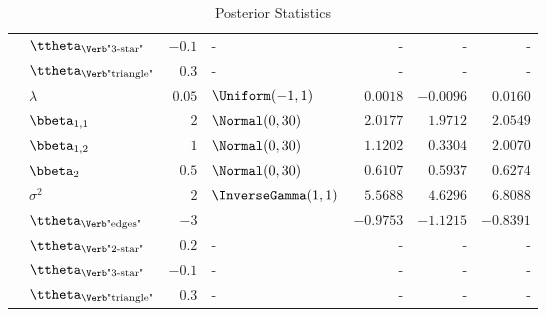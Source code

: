 \begin{table}[t]
\begin{tabular}{cl|rlrrr}
        & $\ttheta_{\text{\Verb"3-star"}}$   & $-0.1$ & -                      & -         & -         & -         \\
        & $\ttheta_{\text{\Verb"triangle"}}$ & $0.3$  & -                      & -         & -         & -         \\
		\midrule
        & $\lambda$                          & $0.05$ & $\Uniform(-1,1)$       & $0.0018$  & $-0.0096$ & $0.0160$  \\
        & $\bbeta_{1,1}$                     & $2$    & $\Normal(0,30)$        & $2.0177$  & $1.9712$  & $2.0549$  \\
        & $\bbeta_{1,2}$                     & $1$    & $\Normal(0,30)$        & $1.1202$  & $0.3304$  & $2.0070$  \\
        & $\bbeta_{2}$                       & $0.5$  & $\Normal(0,30)$        & $0.6107$  & $0.5937$  & $0.6274$  \\
        & $\sigma^2$                         & $2$    & $\InverseGamma(1,1)$   & $5.5688$  & $4.6296$  & $6.8088$  \\
        & $\ttheta_{\text{\Verb"edges"}}$    & $-3$   &  & $-0.9753$ & $-1.1215$ & $-0.8391$ \\
        & $\ttheta_{\text{\Verb"2-star"}}$   & $0.2$  & -                      & -         & -         & -         \\
        & $\ttheta_{\text{\Verb"3-star"}}$   & $-0.1$ & -                      & -         & -         & -         \\
        & $\ttheta_{\text{\Verb"triangle"}}$ & $0.3$  & -                      & -         & -         & -         \\
		\bottomrule
	\end{tabular}
	\caption{Posterior Statistics}
	\label{tab:K-2}
\end{table}


